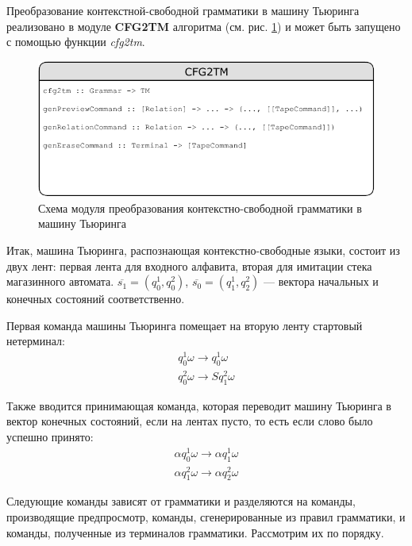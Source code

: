 \documentclass[14pt]{matmex-diploma-custom}
\begin{document}
Преобразование контекстной-свободной грамматики в машину Тьюринга реализовано в модуле \textbf{CFG2TM} алгоритма (см. рис. \ref{fig:cfg2tm}) и может быть запущено с помощью функции \textit{cfg2tm}. 

\begin{figure}[H]
\centering
  \includegraphics[width=\linewidth]{pics/cfg2tm.pdf}
  \caption{Схема модуля преобразования контекстно-свободной грамматики в машину Тьюринга}
  \label{fig:cfg2tm}
\end{figure}

Итак, машина Тьюринга, распознающая контекстно-свободные языки, состоит из двух лент: первая
лента для входного алфавита, вторая для имитации стека магазинного автомата. 
$\overline{s_1} = (q_0^1, q_0^2)$, $\overline{s_0} = (q_1^1, q_2^2)$ --- вектора начальных и конечных
состояний соответственно. 

Первая команда машины Тьюринга помещает на вторую ленту стартовый нетерминал:
$$\begin{array}{lcl}
    q_0^1 \omega \to q_0^1 \omega \\
    q_0^2 \omega \to S q_1^2 \omega 
\end{array}$$

Также вводится принимающая команда, которая переводит машину Тьюринга в вектор конечных состояний, если на лентах пусто, то есть если слово было успешно принято:
$$\begin{array}{lcl}
    \alpha q_0^1 \omega \to \alpha q_1^1 \omega \\
    \alpha q_1^2 \omega \to \alpha q_2^2 \omega 
\end{array}$$

Следующие команды зависят от грамматики и разделяются на команды, производящие предпросмотр, команды, сгенерированные из правил грамматики, 
и команды, полученные из терминалов грамматики. Рассмотрим их по порядку.
\end{document}
